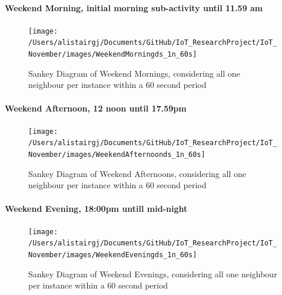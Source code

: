 \documentclass[11pt,]{article}
\let\oldparagraph\paragraph
\renewcommand{\paragraph}[1]{\oldparagraph{#1}\mbox{}}
\begin{document}
\hypertarget{weekend-morning-initial-morning-sub-activity-until-11.59-am}{%
\paragraph{Weekend Morning, initial morning sub-activity until 11.59
am}\label{weekend-morning-initial-morning-sub-activity-until-11.59-am}}

\begin{figure}[H]

{\centering \texttt{[image: /Users/alistairgj/Documents/GitHub/IoT\_ResearchProject/IoT\_November/images/WeekendMorningds\_1n\_60s]} 

}

\caption{Sankey Diagram of Weekend Mornings, considering all one neighbour per instance within a 60 second period}\label{fig:sankey_WeekendMorningds_1n_60s}
\end{figure}

\hypertarget{weekend-afternoon-12-noon-until-17.59pm}{%
\paragraph{Weekend Afternoon, 12 noon until
17.59pm}\label{weekend-afternoon-12-noon-until-17.59pm}}

\begin{figure}[H]

{\centering \texttt{[image: /Users/alistairgj/Documents/GitHub/IoT\_ResearchProject/IoT\_November/images/WeekendAfternoonds\_1n\_60s]} 

}

\caption{Sankey Diagram of Weekend Afternoons, considering all one neighbour per instance within a 60 second period}\label{fig:sankey_WeekendAfternoonds_1n_60s}
\end{figure}

\hypertarget{weekend-evening-1800pm-untill-mid-night}{%
\paragraph{Weekend Evening, 18:00pm untill
mid-night}\label{weekend-evening-1800pm-untill-mid-night}}

\begin{figure}[H]

{\centering \texttt{[image: /Users/alistairgj/Documents/GitHub/IoT\_ResearchProject/IoT\_November/images/WeekendEveningds\_1n\_60s]} 

}

\caption{Sankey Diagram of Weekend Evenings, considering all one neighbour per instance within a 60 second period}\label{fig:sankey_WeekendEveningds_1n_60s}
\end{figure}
\end{document}
